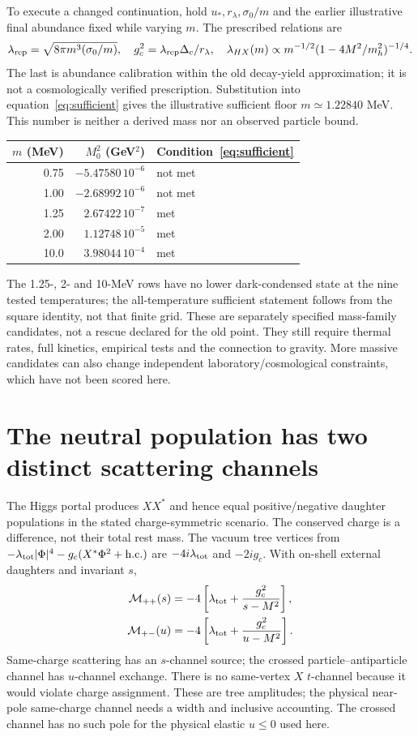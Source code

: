 \documentclass[11pt]{article}
\newcommand{\lp}{\lambda_{HX}}
\newcommand{\lt}{\lambda_{\rm tot}}
\begin{document}
To execute a changed continuation, hold $u_*,r_\lambda,\sigma_0/m$ and the
earlier illustrative final abundance fixed while varying $m$. The prescribed
relations are
\begin{equation}
 \lambda_{\rm rep}=\sqrt{8\pi m^3(\sigma_0/m)},\quad
 g_c^2=\lambda_{\rm rep}\Delta_c/r_\lambda,\quad
 \lp(m)\propto m^{-1/2}(1-4M^2/m_h^2)^{-1/4}.
\end{equation}
The last is abundance calibration within the old decay-yield approximation;
it is not a cosmologically verified prescription. Substitution into
equation~\eqref{eq:sufficient} gives the illustrative sufficient floor
$m\simeq1.22840$ MeV. This number is neither a derived mass nor an observed
particle bound.

\begin{center}
\begin{tabular}{r r l}
\toprule $m$ (MeV) & $M_0^2$ (GeV$^2$) & Condition~\eqref{eq:sufficient}\\\midrule
0.75 & $-5.47580\,10^{-6}$ & not met\\
1.00 & $-2.68992\,10^{-6}$ & not met\\
1.25 & $2.67422\,10^{-7}$ & met\\
2.00 & $1.12748\,10^{-5}$ & met\\
10.0 & $3.98044\,10^{-4}$ & met\\\bottomrule
\end{tabular}
\end{center}
The 1.25-, 2- and 10-MeV rows have no lower dark-condensed state at the
nine tested temperatures; the all-temperature sufficient statement follows
from the square identity, not that finite grid. These are separately
specified mass-family candidates, not a rescue declared for the old point.
They still require thermal rates, full kinetics, empirical tests and the
connection to gravity. More massive candidates can also change independent
laboratory/cosmological constraints, which have not been scored here.

\section{The neutral population has two distinct scattering channels}
The Higgs portal produces $XX^*$ and hence equal positive/negative daughter
populations in the stated charge-symmetric scenario. The conserved charge
is a difference, not their total rest mass. The vacuum tree vertices from
$-\lt|\Phi|^4-g_c(X^*\Phi^2+\mathrm{h.c.})$ are $-4i\lt$ and $-2ig_c$.
With on-shell external daughters and invariant $s$,
\begin{align}
 \mathcal M_{++}(s)&=-4\left[\lt+\frac{g_c^2}{s-M^2}\right],\\
 \mathcal M_{+-}(u)&=-4\left[\lt+\frac{g_c^2}{u-M^2}\right].
\end{align}
Same-charge scattering has an $s$-channel source; the crossed
particle--antiparticle channel has $u$-channel exchange. There is no
same-vertex $X$ $t$-channel because it would violate charge assignment.
These are tree amplitudes; the physical near-pole same-charge channel needs
a width and inclusive accounting. The crossed channel has no such pole for
the physical elastic $u\le0$ used here.
\end{document}
